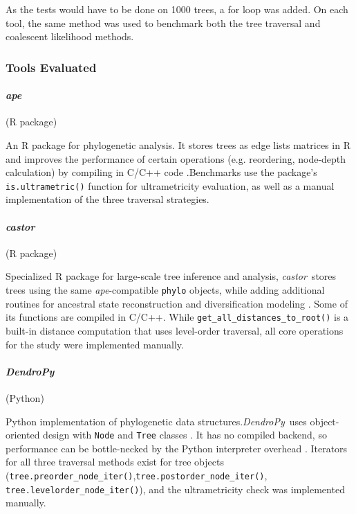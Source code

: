 \documentclass[11pt, a4paper]{article}
\newcommand{\ape}{\textit{ape}}
\newcommand{\dendropy}{\textit{DendroPy}}
\newcommand{\castor}{\textit{castor}}
\begin{document}
As the tests would have to be done on 1000 trees, a for loop was added. On each tool, the same method was used to benchmark both the tree traversal and coalescent likelihood methods. 

\subsubsection{Tools Evaluated}

\paragraph{\ape} (R package)

An R package for phylogenetic analysis. It stores trees as edge lists matrices in R and improves the performance of certain operations (e.g. reordering, node-depth calculation) by compiling in C/C++ code \cite{paradis2004ape}.Benchmarks use the package's \texttt{is.ultrametric()} function for ultrametricity evaluation, as well as a manual implementation of the three traversal strategies.

\paragraph{\castor} (R package)

Specialized R package for large-scale tree inference and analysis, \castor\ stores trees using the same \ape-compatible \texttt{phylo} objects, while adding additional routines for ancestral state reconstruction and diversification modeling \cite{teufel2018castor}. Some of its functions are compiled in C/C++. While \texttt{get\_all\_distances\_to\_root()} is a built-in distance computation that uses level-order traversal, all core operations for the study were implemented manually.  

\paragraph{\dendropy} (Python)

Python implementation of phylogenetic data structures.\dendropy\ uses object-oriented design with \texttt{Node} and \texttt{Tree} classes \cite{sukumaran2010dendropy}. It has no compiled backend, so performance can be bottle-necked by the Python interpreter overhead \cite{berger2022scalene}. Iterators for all three traversal methods exist for tree objects (\texttt{tree.preorder\_node\_iter()},\texttt{tree.postorder\_node\_iter()}, \\ \texttt{tree.levelorder\_node\_iter()}), and the ultrametricity check was implemented manually. 
\end{document}
